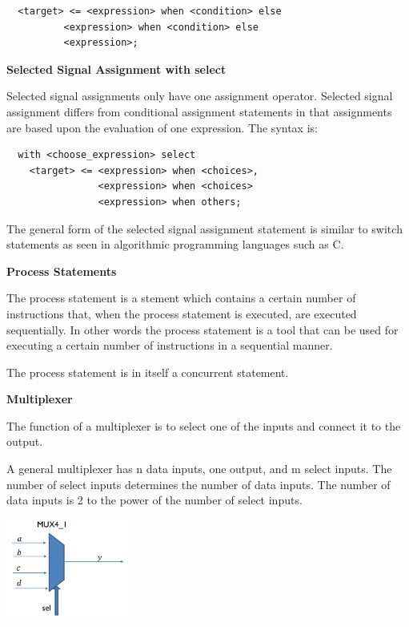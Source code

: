 \begin{verbatim}
  <target> <= <expression> when <condition> else 
          <expression> when <condition> else 
          <expression>;
\end{verbatim}

\textbf{Selected Signal Assignment with select}

Selected signal assignments only have one assignment operator. Selected signal assignment
differs from conditional assignment statements in that assignments are based upon the evaluation
of one expression. The syntax is:

\begin{verbatim}
  with <choose_expression> select
    <target> <= <expression> when <choices>,
                <expression> when <choices>
                <expression> when others;
\end{verbatim}

The general form of the selected signal assignment statement is similar to switch statements
as seen in algorithmic programming languages such as C.

\textbf{Process Statements}

The process statement is a stement which contains a certain number of instructions that, when the process statement
is executed, are executed sequentially. In other words the process statement is a tool that can be used
for executing a certain number of instructions in a sequential manner.

The process statement is in itself a concurrent statement.

\textbf{Multiplexer}

The function of a multiplexer is to select one of the inputs
and connect it to the output.

A general multiplexer has n data inputs, one output, and m select inputs.
The number of select inputs determines the number of data inputs.
The number of data inputs is 2 to the power of the number of select inputs.


\begin{center}
	\includegraphics[width=0.3\textwidth]{images/mux.png}
\end{center}


